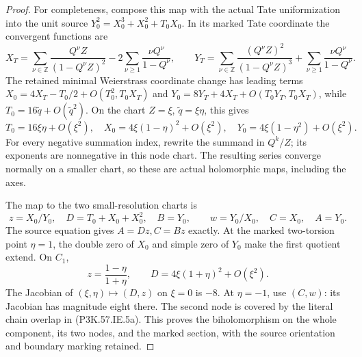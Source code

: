 \begin{proof}
For completeness, compose this map with the actual
Tate uniformization into the unit source
\(Y_0^2=X_0^3+X_0^2+T_0X_0\). In its marked Tate
coordinate the convergent functions are
\[
 X_T=\sum_{\nu\in\mathbb Z}
       \frac{Q^\nu Z}{(1-Q^\nu Z)^2}
       -2\sum_{\nu\ge1}\frac{\nu Q^\nu}{1-Q^\nu},
 \qquad
 Y_T=\sum_{\nu\in\mathbb Z}
       \frac{(Q^\nu Z)^2}{(1-Q^\nu Z)^3}
       +\sum_{\nu\ge1}\frac{\nu Q^\nu}{1-Q^\nu}.
\]
The retained minimal Weierstrass coordinate change
has leading terms
\(X_0=4X_T-T_0/2+O(T_0^2,T_0X_T)\) and
\(Y_0=8Y_T+4X_T+O(T_0Y_T,T_0X_T)\), while
\(T_0=16\widetilde q+O(\widetilde q^2)\).
On the chart \(Z=\xi\),
\(\widetilde q=\xi\eta\), this gives
\[
 T_0=16\xi\eta+O(\xi^2),\quad
 X_0=4\xi(1-\eta)^2+O(\xi^2),\quad
 Y_0=4\xi(1-\eta^2)+O(\xi^2).                       \tag{P3K.57.IE.5b}
\]
For every negative summation index, rewrite the
summand in \(Q^k/Z\); its exponents are nonnegative
in this node chart. The resulting series converge
normally on a smaller chart, so these are actual
holomorphic maps, including the axes.

The map to the two small-resolution charts is
\[
 z=X_0/Y_0,\quad D=T_0+X_0+X_0^2,\quad B=Y_0,
 \qquad
 w=Y_0/X_0,\quad C=X_0,\quad A=Y_0.                 \tag{P3K.57.IE.5c}
\]
The source equation gives \(A=Dz,C=Bz\) exactly.
At the marked two-torsion point \(\eta=1\), the
double zero of \(X_0\) and simple zero of \(Y_0\)
make the first quotient extend. On \(C_1\),
\[
 z=\frac{1-\eta}{1+\eta},\qquad
 D=4\xi(1+\eta)^2+O(\xi^2).
\]
The Jacobian of \((\xi,\eta)\mapsto(D,z)\) on
\(\xi=0\) is \(-8\). At \(\eta=-1\), use
\((C,w)\): its Jacobian has magnitude eight there.
The second node is covered by the literal chain
overlap in (P3K.57.IE.5a). This proves the biholomorphism
on the whole component, its two nodes, and the
marked section, with the source orientation and
boundary marking retained.


\end{proof}
